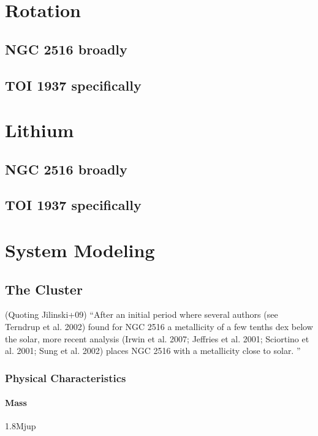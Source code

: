 \documentclass[12pt,twocolumn,tighten]{aastex63}
\begin{document}
\section{Rotation}

  \subsection{NGC 2516 broadly}
  \subsection{TOI 1937 specifically}

\section{Lithium}

  \subsection{NGC 2516 broadly}
  \subsection{TOI 1937 specifically}

\section{System Modeling}
\label{sec:system}

\subsection{The Cluster}
\label{subsec:cluster}

(Quoting Jilinski+09)
``After an initial period where several authors (see Terndrup et al.
2002) found for NGC 2516 a metallicity of a few tenths dex below the
solar, more recent analysis (Irwin et al. 2007; Jeffries et al.  2001;
Sciortino et al. 2001; Sung et al. 2002) places NGC 2516 with a
metallicity close to solar. ''

\subsubsection{Physical Characteristics}
\label{subsec:clusterchar}

\paragraph{Mass} 1.8Mjup
\end{document}
